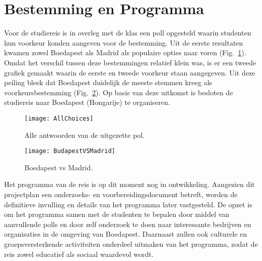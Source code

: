 \section{Bestemming en Programma}

Voor de studiereis is in overleg met de klas een poll opgesteld waarin studenten hun voorkeur konden aangeven voor de bestemming. Uit de eerste resultaten kwamen zowel Boedapest als Madrid als populaire opties naar voren (Fig.~\ref{fig:AllChoices}). Omdat het verschil tussen deze bestemmingen relatief klein was, is er een tweede grafiek gemaakt waarin de eerste en tweede voorkeur staan aangegeven. Uit deze peiling bleek dat Boedapest duidelijk de meeste stemmen kreeg als voorkeursbestemming (Fig.~\ref{fig:MadridVsBoedapest}). Op basis van deze uitkomst is besloten de studiereis naar Boedapest (Hongarije) te organiseren.

\begin{figure}[h!]
	\centering
	\texttt{[image: AllChoices]}
	\label{fig:AllChoices}
	\caption{Alle antwoorden van de uitgezette pol.}
\end{figure}

\begin{figure}[h!]
	\centering
	\texttt{[image: BudapestVSMadrid]}
	\label{fig:MadridVsBoedapest}
	\caption{Boedapest vs Madrid.}
\end{figure}

\newpage

Het programma van de reis is op dit moment nog in ontwikkeling. Aangezien dit projectplan een onderzoeks- en voorbereidingsdocument betreft, worden de definitieve invulling en details van het programma later vastgesteld. De opzet is om het programma samen met de studenten te bepalen door middel van aanvullende polls en door zelf onderzoek te doen naar interessante bedrijven en organisaties in de omgeving van Boedapest. Daarnaast zullen ook culturele en groepsversterkende activiteiten onderdeel uitmaken van het programma, zodat de reis zowel educatief als sociaal waardevol wordt.